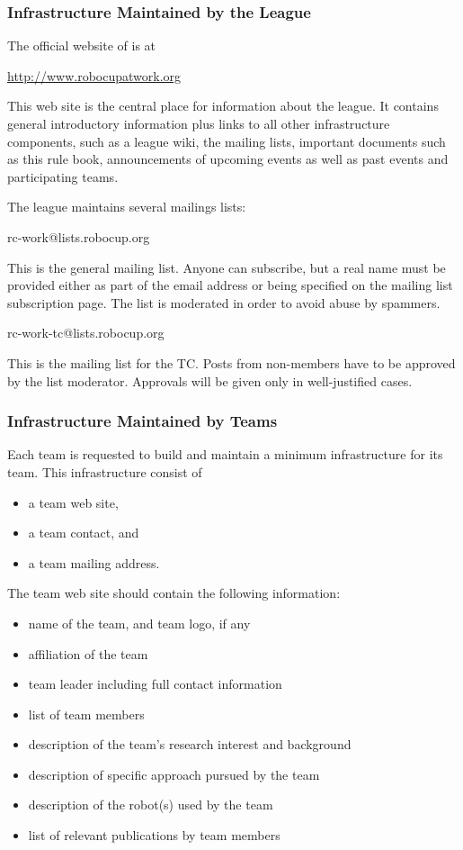 \subsubsection{Infrastructure Maintained by the League}
The official website of \RCAW is at

\url{http://www.robocupatwork.org}

This web site is the central place for information about the league. It contains general introductory information plus links to all other infrastructure components, such as a league wiki, the mailing lists, important documents such as this rule book, announcements of upcoming events as well as past events and participating teams.
\par
The league maintains several mailings lists:
\par
rc-work@lists.robocup.org
\par
{}
This is the general \RCAW mailing list. Anyone can subscribe, but a real name must be provided either as part of the email address or being specified on the mailing list subscription page. The list is moderated in order to avoid abuse by spammers. 
\par
rc-work-tc@lists.robocup.org
\par
This is the mailing list for the TC. Posts from non-members have to be approved by the list moderator. Approvals will be given only in well-justified cases.

\subsubsection{Infrastructure Maintained by Teams}
Each team is requested to build and maintain a minimum infrastructure for its team. This infrastructure consist of 

\begin{itemize}
	\item a team web site,
	\item a team contact, and
	\item a team mailing address.
\end{itemize}

The team web site should contain the following information:

\begin{itemize}
	\item name of the team, and team logo, if any
	\item affiliation of the team
	\item team leader including full contact information
	\item list of team members
	\item description of the team’s research interest and background
	\item description of specific approach pursued by the team
	\item description of the robot(s) used by the team
	\item list of relevant publications by team members

\end{itemize}

